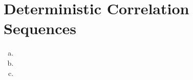\section{Deterministic Correlation Sequences}\label{sec:p1}

\begin{enumerate}[(a)]
\item 
\item 
\item 
\end{enumerate}